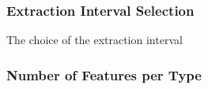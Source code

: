 \subsubsection{Extraction Interval Selection}  %
\label{sec:extraction_interval}
The choice of the extraction interval 

\subsubsection{Number of Features per Type} %